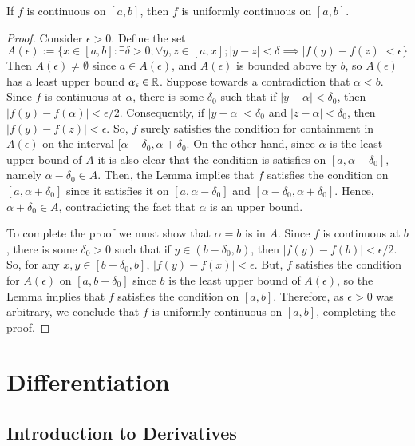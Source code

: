 \documentclass[12pt, a4paper, oneside, openright, titlepage]{book}
\begin{document}
\begin{thm}
    If $f$ is continuous on $[a,b]$, then $f$ is uniformly continuous on $[a,b]$.
\end{thm}
\begin{proof}
    Consider $\epsilon > 0$. Define the set $$A(\epsilon) := \{x \in [a,b]:\exists \delta > 0;\forall y,z \in [a,x];|y-z| < \delta \implies|f(y) - f(z)| < \epsilon\}$$
    Then $A(\epsilon) \neq \emptyset$ since $a \in A(\epsilon)$, and $A(\epsilon)$ is bounded above by $b$, so $A(\epsilon)$ has a least upper bound $\alpha_{\epsilon} \in \mathbb R$. Suppose towards a contradiction that $\alpha < b$. Since $f$ is continuous at $\alpha$, there is some $\delta_0$ such that if $|y-\alpha| < \delta_0$, then $|f(y) - f(\alpha)| < \epsilon/2$. Consequently, if $|y-\alpha| < \delta_0$ and $|z-\alpha| < \delta_0$, then $|f(y) - f(z)| < \epsilon$. So, $f$ surely satisfies the condition for containment in $A(\epsilon)$ on the interval $[\alpha - \delta_0, \alpha + \delta_0$. On the other hand, since $\alpha$ is the least upper bound of $A$ it is also clear that the condition is satisfies on $[a,\alpha - \delta_0]$, namely $\alpha - \delta_0 \in A$. Then, the Lemma implies that $f$ satisfies the condition on $[a,\alpha+\delta_0]$ since it satisfies it on $[a,\alpha - \delta_0]$ and $[\alpha - \delta_0, \alpha + \delta_0]$. Hence, $\alpha + \delta_0 \in A$, contradicting the fact that $\alpha$ is an upper bound.


    To complete the proof we must show that $\alpha = b$ is in $A$. Since $f$ is continuous at $b$, there is some $\delta_0 > 0$ such that if $y \in (b-\delta_0, b)$, then $|f(y) - f(b)| < \epsilon/2$. So, for any $x,y \in [b-\delta_0,b]$, $|f(y) - f(x)| < \epsilon$. But, $f$ satisfies the condition for $A(\epsilon)$ on $[a,b-\delta_0]$ since $b$ is the least upper bound of $A(\epsilon)$, so the Lemma implies that $f$ satisfies the condition on $[a,b]$. Therefore, as $\epsilon > 0$ was arbitrary, we conclude that $f$ is uniformly continuous on $[a,b]$, completing the proof.
\end{proof}







\chapter{Differentiation}

\section{Introduction to Derivatives}
\end{document}
